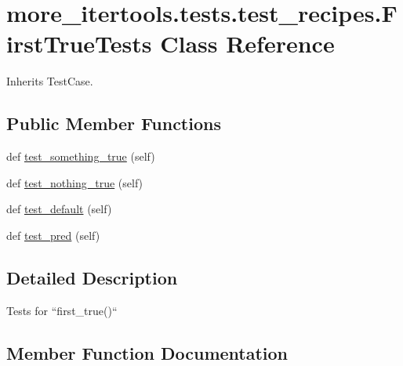 \hypertarget{classmore__itertools_1_1tests_1_1test__recipes_1_1_first_true_tests}{}\section{more\+\_\+itertools.\+tests.\+test\+\_\+recipes.\+First\+True\+Tests Class Reference}
\label{classmore__itertools_1_1tests_1_1test__recipes_1_1_first_true_tests}


Inherits Test\+Case.

\subsection*{Public Member Functions}
\begin{DoxyCompactItemize}
\item 
def \hyperlink{classmore__itertools_1_1tests_1_1test__recipes_1_1_first_true_tests_a10924de9e39fa0c0a2d0b24206a7f0ee}{test\+\_\+something\+\_\+true} (self)
\item 
def \hyperlink{classmore__itertools_1_1tests_1_1test__recipes_1_1_first_true_tests_a0800ac98e3e8d0c2caa896990844b090}{test\+\_\+nothing\+\_\+true} (self)
\item 
def \hyperlink{classmore__itertools_1_1tests_1_1test__recipes_1_1_first_true_tests_a084dd30aaa034d453abe5609fea479eb}{test\+\_\+default} (self)
\item 
def \hyperlink{classmore__itertools_1_1tests_1_1test__recipes_1_1_first_true_tests_a0fa1c73d1ef94ac4553275a83f5c104e}{test\+\_\+pred} (self)
\end{DoxyCompactItemize}


\subsection{Detailed Description}
\begin{DoxyVerb}Tests for ``first_true()``\end{DoxyVerb}
 

\subsection{Member Function Documentation}
\mbox{\label{classmore__itertools_1_1tests_1_1test__recipes_1_1_first_true_tests_a084dd30aaa034d453abe5609fea479eb}} 
